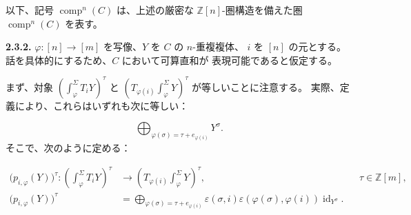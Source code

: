 以下、記号 $\operatorname{comp}^{n}(C)$ は、上述の厳密な
$\mathbb Z[n]$-圏構造を備えた圏 $\operatorname{comp}^{n}(C)$ を表す。

\noindent\textbf{2.3.2.}\quad
$\varphi\colon[n]\longrightarrow[m]$ を写像、$Y$ を $C$ の $n$-重複複体、
$i$ を $[n]$ の元とする。話を具体的にするため、$C$ において可算直和が
表現可能であると仮定する。

まず、対象
$\left(\int_\varphi^\Sigma T_iY\right)^\tau$ と
$\left(T_{\varphi(i)}\int_\varphi^\Sigma Y\right)^\tau$ が等しいことに注意する。
実際、定義により、これらはいずれも次に等しい：

\begin{equation*}
  \bigoplus_{\varphi(\sigma)=\tau+e_{\varphi(i)}}Y^\sigma.
\end{equation*}
そこで、次のように定める：

\begin{equation}
  \begin{aligned}
    \bigl(p_{i,\varphi}(Y)\bigr)^\tau\colon
    \left(\int_\varphi^\Sigma T_iY\right)^\tau
      &\longrightarrow
    \left(T_{\varphi(i)}\int_\varphi^\Sigma Y\right)^\tau,
      &&\tau\in\mathbb Z[m],\\[2pt]
    \bigl(p_{i,\varphi}(Y)\bigr)^\tau
      &=\bigoplus_{\varphi(\sigma)=\tau+e_{\varphi(i)}}
        \varepsilon(\sigma,i)\varepsilon(\varphi(\sigma),\varphi(i))
        \operatorname{id}_{Y^\sigma}.
  \end{aligned}
  \tag{2.3.2.1}
\end{equation}
